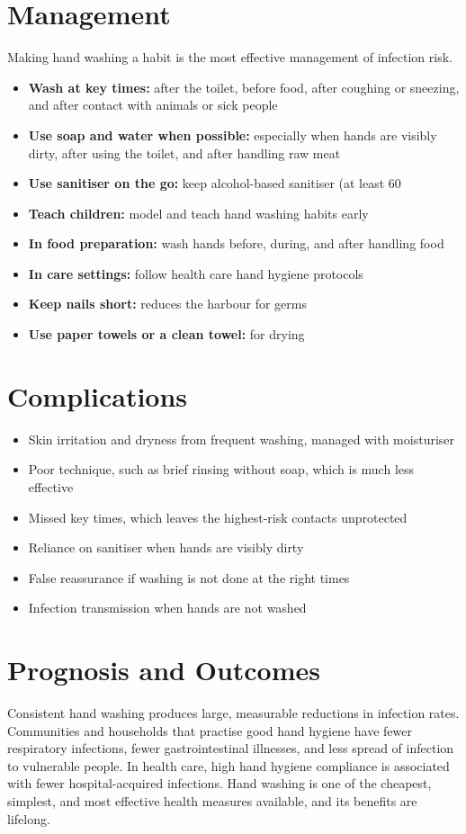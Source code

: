 \section*{Management}
Making hand washing a habit is the most effective management of infection risk.

\begin{itemize}
    \item \textbf{Wash at key times:} after the toilet, before food, after coughing or sneezing, and after contact with animals or sick people
    \item \textbf{Use soap and water when possible:} especially when hands are visibly dirty, after using the toilet, and after handling raw meat
    \item \textbf{Use sanitiser on the go:} keep alcohol-based sanitiser (at least 60%
    \item \textbf{Teach children:} model and teach hand washing habits early
    \item \textbf{In food preparation:} wash hands before, during, and after handling food
    \item \textbf{In care settings:} follow health care hand hygiene protocols
    \item \textbf{Keep nails short:} reduces the harbour for germs
    \item \textbf{Use paper towels or a clean towel:} for drying
\end{itemize}

\section*{Complications}
\begin{itemize}
    \item Skin irritation and dryness from frequent washing, managed with moisturiser
    \item Poor technique, such as brief rinsing without soap, which is much less effective
    \item Missed key times, which leaves the highest-risk contacts unprotected
    \item Reliance on sanitiser when hands are visibly dirty
    \item False reassurance if washing is not done at the right times
    \item Infection transmission when hands are not washed
\end{itemize}

\section*{Prognosis and Outcomes}
Consistent hand washing produces large, measurable reductions in infection rates. Communities and households that practise good hand hygiene have fewer respiratory infections, fewer gastrointestinal illnesses, and less spread of infection to vulnerable people. In health care, high hand hygiene compliance is associated with fewer hospital-acquired infections. Hand washing is one of the cheapest, simplest, and most effective health measures available, and its benefits are lifelong.

